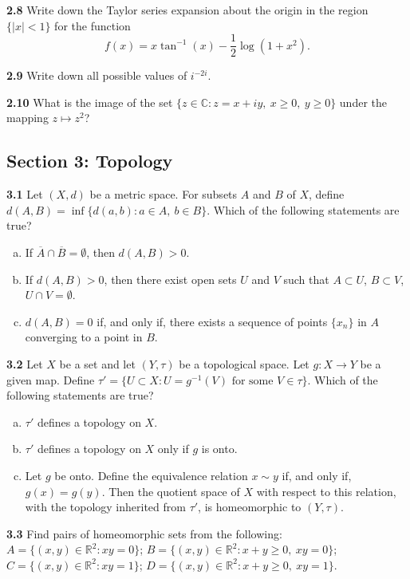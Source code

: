 \documentclass[11pt,a4paper]{article}
\newcommand{\R}{\mathbb{R}}
\newcommand{\C}{\mathbb{C}}
\newcommand{\examsec}[1]{%
  \subsection*{#1}
  \vspace{-2pt}
}
\newcommand{\qitem}[1]{\par\medskip\noindent\textbf{#1}\hspace{0.5em}}
\begin{document}
\qitem{2.8} Write down the Taylor series expansion about the origin in the region $\{|x| < 1\}$ for the function
\[
  f(x) = x\tan^{-1}(x) - \frac{1}{2}\log(1 + x^2).
\]

\qitem{2.9} Write down all possible values of $i^{-2i}$.

\qitem{2.10} What is the image of the set $\{z \in \C : z = x + iy,\ x \ge 0,\ y \ge 0\}$ under the mapping $z \mapsto z^2$?

\examsec{Section 3: Topology}

\qitem{3.1} Let $(X, d)$ be a metric space. For subsets $A$ and $B$ of $X$, define $d(A, B) = \inf\{d(a, b) : a \in A,\ b \in B\}$. Which of the following statements are true?
\begin{enumerate}[a.]
  \item If $\overline{A} \cap \overline{B} = \emptyset$, then $d(A, B) > 0$.
  \item If $d(A, B) > 0$, then there exist open sets $U$ and $V$ such that $A \subset U$, $B \subset V$, $U \cap V = \emptyset$.
  \item $d(A, B) = 0$ if, and only if, there exists a sequence of points $\{x_n\}$ in $A$ converging to a point in $B$.
\end{enumerate}

\qitem{3.2} Let $X$ be a set and let $(Y, \tau)$ be a topological space. Let $g : X \to Y$ be a given map. Define $\tau' = \{U \subset X : U = g^{-1}(V) \text{ for some } V \in \tau\}$. Which of the following statements are true?
\begin{enumerate}[a.]
  \item $\tau'$ defines a topology on $X$.
  \item $\tau'$ defines a topology on $X$ only if $g$ is onto.
  \item Let $g$ be onto. Define the equivalence relation $x \sim y$ if, and only if, $g(x) = g(y)$. Then the quotient space of $X$ with respect to this relation, with the topology inherited from $\tau'$, is homeomorphic to $(Y, \tau)$.
\end{enumerate}

\qitem{3.3} Find pairs of homeomorphic sets from the following:\\
$A = \{(x, y) \in \R^2 : xy = 0\}$; \quad $B = \{(x, y) \in \R^2 : x + y \ge 0,\ xy = 0\}$;\\
$C = \{(x, y) \in \R^2 : xy = 1\}$; \quad $D = \{(x, y) \in \R^2 : x + y \ge 0,\ xy = 1\}$.
\end{document}
